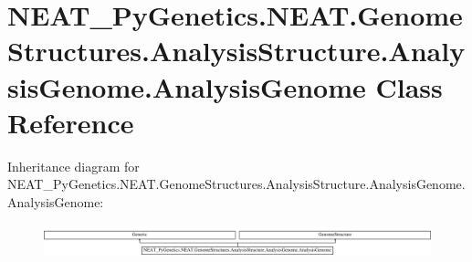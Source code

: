 \hypertarget{class_n_e_a_t___py_genetics_1_1_n_e_a_t_1_1_genome_structures_1_1_analysis_structure_1_1_analysis_genome_1_1_analysis_genome}{}\section{N\+E\+A\+T\+\_\+\+Py\+Genetics.\+N\+E\+A\+T.\+Genome\+Structures.\+Analysis\+Structure.\+Analysis\+Genome.\+Analysis\+Genome Class Reference}
\label{class_n_e_a_t___py_genetics_1_1_n_e_a_t_1_1_genome_structures_1_1_analysis_structure_1_1_analysis_genome_1_1_analysis_genome}
Inheritance diagram for N\+E\+A\+T\+\_\+\+Py\+Genetics.\+N\+E\+A\+T.\+Genome\+Structures.\+Analysis\+Structure.\+Analysis\+Genome.\+Analysis\+Genome\+:\begin{figure}[H]
\begin{center}
\leavevmode
\includegraphics[height=0.984183cm]{class_n_e_a_t___py_genetics_1_1_n_e_a_t_1_1_genome_structures_1_1_analysis_structure_1_1_analysis_genome_1_1_analysis_genome}
\end{center}
\end{figure}
